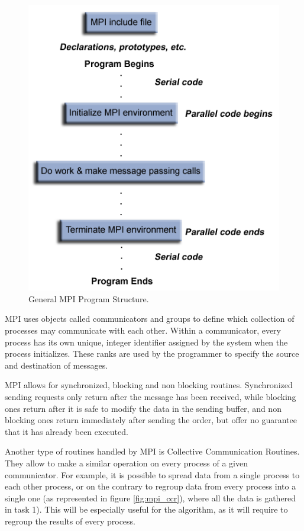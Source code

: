 \begin{figure}[H]
\centering
\includegraphics[width=.5\textwidth]{Parallelisation/Cluster/Img/prog_structure.png}
\caption{General MPI Program Structure. \cite{mpi_tuto}}
\label{fig:mpi_struct}
\end{figure}

MPI uses objects called communicators and groups to define which collection of processes may communicate with each other.
Within a communicator, every process has its own unique, integer identifier assigned by the system when the process initializes.
These ranks are used by the programmer to specify the source and destination of messages.

MPI allows for synchronized, blocking and non blocking routines.
Synchronized sending requests only return after the message has been received, while blocking ones return after it is safe to modify the data in the sending buffer, and non blocking ones return immediately after sending the order, but offer no guarantee that it has already been executed.

Another type of routines handled by MPI is Collective Communication Routines.
They allow to make a similar operation on every process of a given communicator.
For example, it is possible to spread data from a single process to each other process, or on the contrary to regroup data from every process into a single one (as represented in figure \ref{fig:mpi_ccr}), where all the data is gathered in task 1).
This will be especially useful for the algorithm, as it will require to regroup the results of every process.

